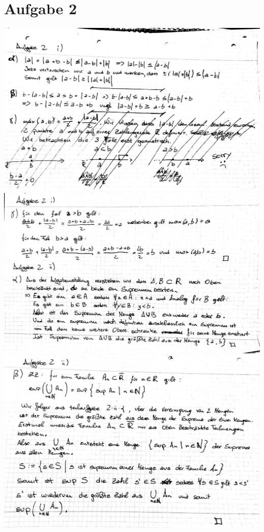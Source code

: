 \documentclass[12pt,a4paper,landscape]{article}
\begin{document}
\section{Aufgabe 2}
\includegraphics[scale=0.2]{AB4_3.jpg} \newpage
\includegraphics[scale=0.2]{AB4_4.jpg} \newpage
\includegraphics[scale=0.2]{AB4_5.jpg} 
\end{document}
